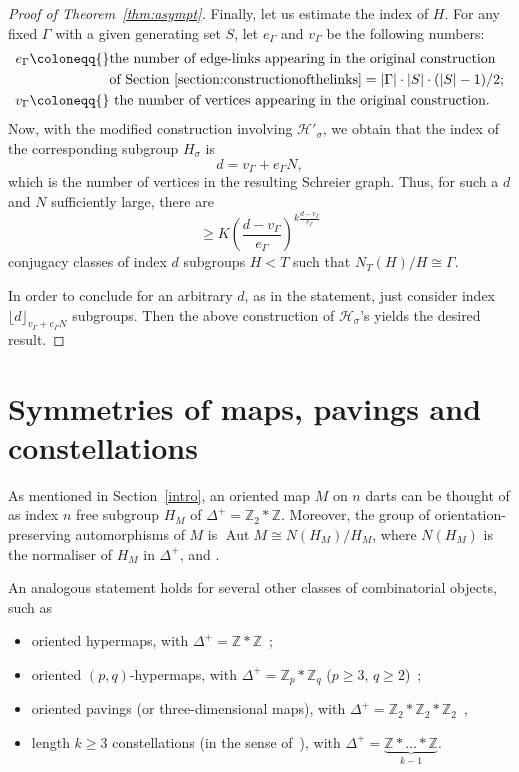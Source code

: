 \documentclass[ALCO,ThmDefs,Unicode,epreuves]{cedram}
\newcommand{\cH}{\mathcal{H}}
\DeclareMathOperator{\aut}{Aut}
\begin{document}
\begin{proof}[{Proof of Theorem~\ref{thm:asympt}}]
Finally, let us estimate the index of $H$. For any fixed ${\Gamma}$ with a given generating set $S$, let $e_\Gamma$ and $v_\Gamma$ be the following numbers:
\begin{alignat*}{10}
e_{\Gamma} \coloneqq{}& \text{the number of edge-links appearing in the original construction}\\
 & \text{of Section~\ref{section:constructionofthelinks}} = |\Gamma| \cdot |S| \cdot (|S|-1)/2;\\ 
v_{\Gamma} \coloneqq {}& \text{ the number of vertices appearing in the original construction.}
\end{alignat*}
Now, with the modified construction involving $\cH'_{\sigma}$, we obtain that the index of the corresponding subgroup $H_\sigma$ is
\[
d = v_{\Gamma} + e_{\Gamma} N,
\]
which is the number of vertices in the resulting Schreier graph. Thus, for such a $d$ and $N$ sufficiently large, there are 
\[
\geq K\left(\frac{d-v_\Gamma}{e_\Gamma}\right)^{k\frac{d-v_\Gamma}{e_\Gamma}}
\]
conjugacy classes of index $d$ subgroups $H < T$ such that $N_T(H)/H \cong \Gamma$.

In order to conclude for an arbitrary $d$, as in the statement, just consider index $\lfloor d \rfloor_{v_{\Gamma}+e_{\Gamma} N}$ subgroups. Then the above construction of $\cH_\sigma$'s yields the desired result.
\end{proof}

\section{Symmetries of maps, pavings and constellations}\label{section:symmetries}

As mentioned in Section~\ref{intro}, an oriented map $M$ on $n$ darts can be thought of as index $n$ free subgroup $H_M$ of $\Delta^+ = \mathbb{Z}_2*\mathbb{Z}$. Moreover, the group of orientation-preserving automorphisms of $M$ is $\aut M \cong N(H_M)/H_M$, where $N(H_M)$ is the normaliser of $H_M$ in $\Delta^+$, %
\cf \cite{BrMeNe} and \cite[Theorem~3.8]{JoSi}. 

An analogous statement holds for several other classes of combinatorial objects, such as 
\begin{itemize}
\item oriented hypermaps, with $\Delta^+ = \mathbb{Z}*\mathbb{Z}$~\cite{MN1, MN2};
\item oriented $(p, q)$-hypermaps, with $\Delta^+ = \mathbb{Z}_p*\mathbb{Z}_q$ ($p\geq 3$, $q\geq 2$)~\cite{CK1};
\item oriented pavings (or three-dimensional maps), with $\Delta^+ = \mathbb{Z}_2*\mathbb{Z}_2*\mathbb{Z}_2$~\cite{CK2},
\item length $k\geq 3$ constellations (in the sense of~\cite[Definition~1.1.1]{LZ}), with $\Delta^+ = \underbrace{\mathbb{Z}* \dots *\mathbb{Z}}_{k-1}$.
\end{itemize}
\end{document}
